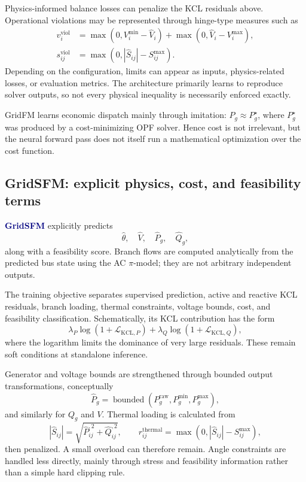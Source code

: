 \documentclass[11pt,a4paper]{article}
\newcommand{\model}[1]{\textcolor{navy}{\textbf{#1}}}
\begin{document}
Physics-informed balance losses can penalize the KCL residuals above. Operational violations may be represented through hinge-type measures such as
\begin{align}
v_i^{\mathrm{viol}} &= \max(0,V_i^{\min}-\widehat V_i)
 +\max(0,\widehat V_i-V_i^{\max}),\\
s_{ij}^{\mathrm{viol}} &= \max(0,|\widehat S_{ij}|-S_{ij}^{\max}).
\end{align}
Depending on the configuration, limits can appear as inputs, physics-related losses, or evaluation metrics. The architecture primarily learns to reproduce solver outputs, so not every physical inequality is necessarily enforced exactly.

GridFM learns economic dispatch mainly through imitation: $\widehat P_g\approx P_g^\star$, where $P_g^\star$ was produced by a cost-minimizing OPF solver. Hence cost is not irrelevant, but the neural forward pass does not itself run a mathematical optimization over the cost function.

\subsection{GridSFM: explicit physics, cost, and feasibility terms}

\model{GridSFM} explicitly predicts
\[
\widehat\theta,\quad\widehat V,\quad\widehat P_g,\quad\widehat Q_g,
\]
along with a feasibility score. Branch flows are computed analytically from the predicted bus state using the AC $\pi$-model; they are not arbitrary independent outputs.

The training objective separates supervised prediction, active and reactive KCL residuals, branch loading, thermal constraints, voltage bounds, cost, and feasibility classification. Schematically, its KCL contribution has the form
\[
\lambda_{P}\log(1+\mathcal L_{\mathrm{KCL},P})+
\lambda_{Q}\log(1+\mathcal L_{\mathrm{KCL},Q}),
\]
where the logarithm limits the dominance of very large residuals. These remain soft conditions at standalone inference.

Generator and voltage bounds are strengthened through bounded output transformations, conceptually
\[
\widehat P_g=\operatorname{bounded}(P_g^{\mathrm{raw}},P_g^{\min},P_g^{\max}),
\]
and similarly for $Q_g$ and $V$. Thermal loading is calculated from
\[
|\widehat S_{ij}|=\sqrt{\widehat P_{ij}^{,2}+\widehat Q_{ij}^{,2}},
\qquad
r_{ij}^{\mathrm{thermal}}=\max(0,|\widehat S_{ij}|-S_{ij}^{\max}),
\]
then penalized. A small overload can therefore remain. Angle constraints are handled less directly, mainly through stress and feasibility information rather than a simple hard clipping rule.
\end{document}

